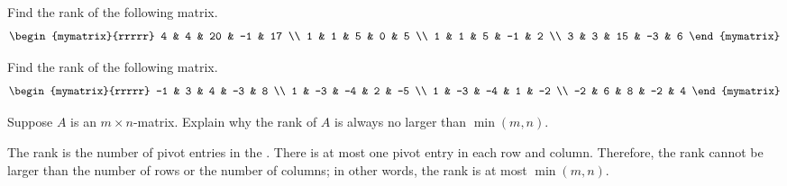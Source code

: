 \begin{ex} Find the rank of the following matrix.
\begin{equation*}
\begin{mymatrix}{rrrrr}
4 & 4 & 20 & -1 & 17 \\
1 & 1 & 5 & 0 & 5 \\
1 & 1 & 5 & -1 & 2 \\
3 & 3 & 15 & -3 & 6
\end{mymatrix}
\end{equation*}
\end{ex}

\begin{ex} Find the rank of the following matrix.
\begin{equation*}
\begin{mymatrix}{rrrrr}
-1 & 3 & 4 & -3 & 8 \\
1 & -3 & -4 & 2 & -5 \\
1 & -3 & -4 & 1 & -2 \\
-2 & 6 & 8 & -2 & 4
\end{mymatrix}
\end{equation*}
\end{ex}

\begin{ex}
  Suppose $A$ is an $m\times n$-matrix. Explain why the rank of $A$ is
  always no larger than $\min (m,n)$.
  \begin{sol}
    The rank is the number of pivot entries in the {\ef}. There is at
    most one pivot entry in each row and column. Therefore, the rank
    cannot be larger than the number of rows or the number of columns;
    in other words, the rank is at most $\min(m,n)$.
  \end{sol}
\end{ex}


